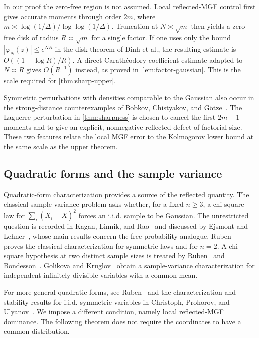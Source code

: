 In our proof the zero-free region is not assumed. Local reflected-MGF control first gives accurate moments through order $2m$, where $m\asymp\log(1/\Delta)/\log\log(1/\Delta)$. Truncation at $N\asymp\sqrt m$ then yields a zero-free disk of radius $R\asymp\sqrt m$ for a single factor. If one uses only the bound $|\varphi_N(z)|\le e^{NR}$ in the disk theorem of Dinh et al., the resulting estimate is $O((1+\log R)/R)$. A direct Carath\'eodory coefficient estimate adapted to $N\asymp R$ gives $O(R^{-1})$ instead, as proved in \cref{lem:factor-gaussian}. This is the scale required for \cref{thm:sharp-upper}.

Symmetric perturbations with densities comparable to the Gaussian also occur in the strong-distance counterexamples of Bobkov, Chistyakov, and G\"otze~\cite{BobkovChistyakovGotze2013}. The Laguerre perturbation in \cref{thm:sharpness} is chosen to cancel the first $2m-1$ moments and to give an explicit, nonnegative reflected defect of factorial size. These two features relate the local MGF error to the Kolmogorov lower bound at the same scale as the upper theorem.

\subsection{Quadratic forms and the sample variance}

Quadratic-form characterization provides a source of the reflected quantity. The classical sample-variance problem asks whether, for a fixed $n\ge3$, a chi-square law for $\sum_i(X_i-\bar X)^2$ forces an i.i.d. sample to be Gaussian. The unrestricted question is recorded in Kagan, Linnik, and Rao~\cite[p.~466]{KaganLinnikRao1973} and discussed by Ejsmont and Lehner~\cite{EjsmontLehner2017}, whose main results concern the free-probability analogue. Ruben~\cite{Ruben1974} proves the classical characterization for symmetric laws and for $n=2$. A chi-square hypothesis at two distinct sample sizes is treated by Ruben~\cite{Ruben1975} and Bondesson~\cite{Bondesson1977}. Golikova and Kruglov~\cite{GolikovaKruglov2015} obtain a sample-variance characterization for independent infinitely divisible variables with a common mean.

For more general quadratic forms, see Ruben~\cite{Ruben1978} and the characterization and stability results for i.i.d. symmetric variables in Christoph, Prohorov, and Ulyanov~\cite{ChristophProhorovUlyanov2001}. We impose a different condition, namely local reflected-MGF dominance. The following theorem does not require the coordinates to have a common distribution.

